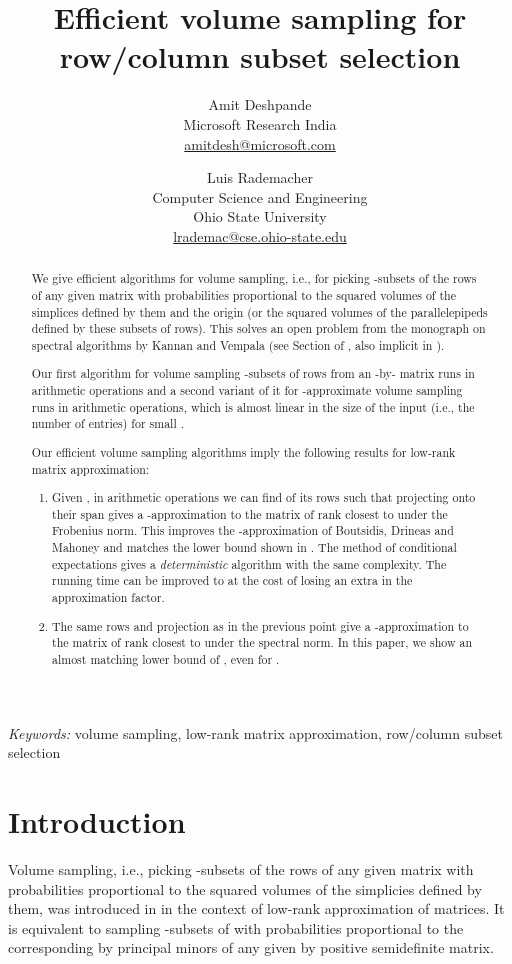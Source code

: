 \documentclass[11pt]{article}
\title{Efficient volume sampling for row/column subset selection}
\author{Amit Deshpande \\
Microsoft Research India \\
\url{amitdesh@microsoft.com}
\and
Luis Rademacher \\
Computer Science and Engineering \\
Ohio State University \\
\url{lrademac@cse.ohio-state.edu}}
\date{}
\newcommand{\keywords}[1]{\emph{Keywords:} #1}
\begin{document}
\maketitle

\begin{abstract}
We give efficient algorithms for volume sampling, i.e., for picking -subsets of the rows of any given matrix with probabilities proportional to the squared volumes of the simplices defined by them and the origin (or the squared volumes of the parallelepipeds defined by these subsets of rows).
This solves an open problem from the monograph on spectral algorithms by Kannan and Vempala (see Section  of \cite{KV}, also implicit in \cite{BDM, DRVW}).

Our first algorithm for volume sampling -subsets of rows from an -by- matrix runs in  arithmetic operations and a second variant of it for -approximate volume sampling runs in  arithmetic operations, which is almost linear in the size of the input (i.e., the number of entries) for small .

Our efficient volume sampling algorithms imply the following results for low-rank matrix approximation:
\begin{enumerate}
\item Given , in  arithmetic operations we can find  of its rows such that projecting onto their span gives a -approximation to the matrix of rank  closest to  under the Frobenius norm. This improves the -approximation of Boutsidis, Drineas and Mahoney \cite{BDM} and matches the lower bound shown in \cite{DRVW}. The method of conditional expectations gives a \emph{deterministic} algorithm with the same complexity. The running time can be improved to  at the cost of losing an extra  in the approximation factor.
\item The same rows and projection as in the previous point give a -approximation to the matrix of rank  closest to  under the spectral norm. In this paper, we show an almost matching lower bound of , even for .
\end{enumerate}
\end{abstract}

\keywords{volume sampling, low-rank matrix approximation, row/column subset selection}

\section{Introduction}

Volume sampling, i.e., picking -subsets of the rows of any given matrix with probabilities proportional to the squared volumes of the simplicies defined by them, was introduced in \cite{DRVW} in the context of low-rank approximation of matrices. It is equivalent to sampling -subsets of  with probabilities proportional to the corresponding  by  principal minors of any given  by  positive semidefinite matrix.
\end{document}
